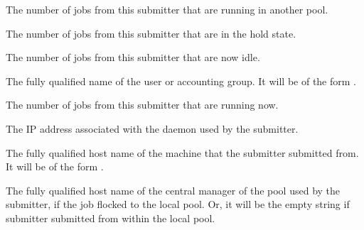 
\begin{description}

\item[\AdAttr{FlockedJobs}:] The number of jobs from this submitter 
that are running in another pool.

\item[\AdAttr{HeldJobs}:] The number of jobs from this submitter 
that are in the hold state.

\item[\AdAttr{IdleJobs}:] The number of jobs from this submitter 
that are now idle.

\item[\AdAttr{Name}:] The fully qualified name of the user or accounting group.
It will be of the form .

\item[\AdAttr{RunningJobs}:] The number of jobs from this submitter 
that are running now.

\item[\AdAttr{ScheddIpAddr}:] The IP address associated with the
 daemon used by the submitter.

\item[\AdAttr{ScheddName}:] The fully qualified host name of the machine 
that the submitter submitted from.
It will be of the form .

\item[\AdAttr{SubmitterTag}:] The fully qualified host name of the
central manager of the pool used by the submitter,
if the job flocked to the local pool.
Or, it will be the empty string if submitter submitted from within
the local pool.


\end{description}

